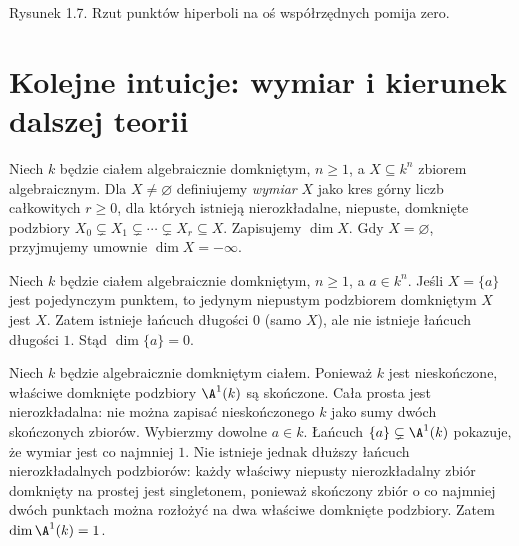 \begin{center}
\end{center}
\begin{center}\small Rysunek 1.7. Rzut punktów hiperboli na oś współrzędnych pomija zero.\end{center}

\section{Kolejne intuicje: wymiar i kierunek dalszej teorii}

\begin{definicja}
Niech $k$ będzie ciałem algebraicznie domkniętym,
$n\ge1$, a $X\subseteq k^n$ zbiorem algebraicznym.
Dla $X\ne\varnothing$ definiujemy \emph{wymiar} $X$ jako kres górny liczb
całkowitych $r\ge0$, dla których istnieją
nierozkładalne, niepuste, domknięte podzbiory
$X_0\subsetneq X_1\subsetneq\cdots\subsetneq X_r\subseteq X$.
Zapisujemy $\dim X$. Gdy $X=\varnothing$, przyjmujemy
umownie $\dim X=-\infty$.
\end{definicja}

\begin{przyklad}
Niech $k$ będzie ciałem algebraicznie domkniętym,
$n\ge1$, a $a\in k^n$. Jeśli $X=\{a\}$ jest pojedynczym punktem, to jedynym
niepustym podzbiorem domkniętym $X$ jest $X$.
Zatem istnieje łańcuch długości $0$ (samo $X$),
ale nie istnieje łańcuch długości $1$.
Stąd $\dim\{a\}=0$.
\end{przyklad}

\begin{przyklad}
Niech $k$ będzie algebraicznie domkniętym ciałem.
Ponieważ $k$ jest nieskończone, właściwe domknięte
podzbiory $\A^1(k)$ są skończone.
Cała prosta jest nierozkładalna: nie można zapisać
nieskończonego $k$ jako sumy dwóch skończonych zbiorów.
Wybierzmy dowolne $a\in k$. Łańcuch
$\{a\}\subsetneq\A^1(k)$ pokazuje, że wymiar jest co najmniej $1$.
Nie istnieje jednak dłuższy łańcuch nierozkładalnych
podzbiorów: każdy właściwy niepusty nierozkładalny zbiór
domknięty na prostej jest singletonem, ponieważ skończony
zbiór o co najmniej dwóch punktach można rozłożyć na dwa
właściwe domknięte podzbiory.
Zatem $\dim\A^1(k)=1$.
\end{przyklad}


